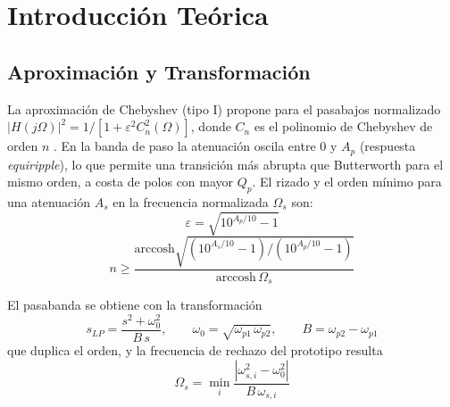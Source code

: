 \section{Introducción Teórica}
\label{sec_2}

\subsection{Aproximación y Transformación}
\label{sec_2.1}
La aproximación de Chebyshev (tipo I) propone para el pasabajos normalizado $|H(j\Omega)|^2 = 1/\left[1 + \varepsilon^2 C_n^2(\Omega)\right]$, donde $C_n$ es el polinomio de Chebyshev de orden $n$ \cite[sec.~4.3]{daryanani}. En la banda de paso la atenuación oscila entre $0$ y $A_p$ (respuesta \textit{equiripple}), lo que permite una transición más abrupta que Butterworth para el mismo orden, a costa de polos con mayor $Q_p$. El rizado y el orden mínimo para una atenuación $A_s$ en la frecuencia normalizada $\Omega_s$ son:
\begin{equation}
    \varepsilon = \sqrt{10^{A_p/10} - 1}
    \label{eq:eps}
\end{equation}
\begin{equation}
    n \geq \frac{\mathrm{arccosh}\sqrt{\left(10^{A_s/10} - 1\right)/\left(10^{A_p/10} - 1\right)}}{\mathrm{arccosh} \, \Omega_s}
    \label{eq:orden}
\end{equation}

El pasabanda se obtiene con la transformación \cite[sec.~4.7.2]{daryanani}
\begin{equation}
    s_{LP} = \frac{s^2 + \omega_0^2}{B \, s}, \qquad \omega_0 = \sqrt{\omega_{p1} \, \omega_{p2}}, \qquad B = \omega_{p2} - \omega_{p1}
    \label{eq:transf}
\end{equation}
que duplica el orden, y la frecuencia de rechazo del prototipo resulta
\begin{equation}
    \Omega_s = \min_{i} \frac{\left|\omega_{s,i}^2 - \omega_0^2\right|}{B \, \omega_{s,i}}
    \label{eq:omegas}
\end{equation}

